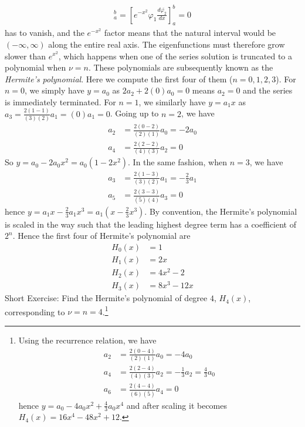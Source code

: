 \begin{solution}
\begin{align*}
[\varphi_1 p(x) \frac{d\overline{\varphi_2}}{dx}]_a^b = [e^{-x^2} \varphi_1 \frac{d\overline{\varphi_2}}{dx}]_a^b = 0
\end{align*}
has to vanish, and the $e^{-x^2}$ factor means that the natural interval would be $(-\infty, \infty)$ along the entire real axis. The eigenfunctions must therefore grow slower than $e^{x^2}$, which happens when one of the series solution is truncated to a polynomial when $\nu = n$. These polynomials are subsequently known as the \textit{Hermite's polynomial}. Here we compute the first four of them ($n=0,1,2,3$). For $n=0$, we simply have $y = a_0$ as $2a_2 + 2(0)a_0 = 0$ means $a_2 = 0$ and the series is immediately terminated. For $n=1$, we similarly have $y = a_1x$ as $a_3 = \frac{2(1-1)}{(3)(2)}a_1 = (0)a_1 = 0$. Going up to $n=2$, we have
\begin{align*}
a_2 &= \frac{2(0-2)}{(2)(1)}a_0 = -2a_0 \\
a_4 &= \frac{2(2-2)}{(4)(3)}a_2 = 0
\end{align*}
So $y = a_0 - 2a_0 x^2 = a_0(1-2x^2)$. In the same fashion, when $n=3$, we have
\begin{align*}
a_3 &= \frac{2(1-3)}{(3)(2)}a_1 = -\frac{2}{3}a_1 \\
a_5 &= \frac{2(3-3)}{(5)(4)}a_3 = 0
\end{align*}
hence $y = a_1x - \frac{2}{3}a_1x^3 = a_1(x-\frac{2}{3}x^3)$. By convention, the Hermite's polynomial is scaled in the way such that the leading highest degree term has a coefficient of $2^n$. Hence the first four of Hermite's polynomial are
\begin{align*}
H_0(x) &= 1 \\
H_1(x) &= 2x \\
H_2(x) &= 4x^2 - 2 \\
H_3(x) &= 8x^3 - 12x
\end{align*}
Short Exercise: Find the Hermite's polynomial of degree $4$, $H_4(x)$, corresponding to $\nu = n = 4$.\footnote{Using the recurrence relation, we have
\begin{align*}
a_2 &= \frac{2(0-4)}{(2)(1)}a_0 = -4a_0 \\
a_4 &= \frac{2(2-4)}{(4)(3)}a_2 = -\frac{1}{3}a_2 = \frac{4}{3}a_0 \\
a_6 &= \frac{2(4-4)}{(6)(5)}a_4 = 0
\end{align*}
hence $y = a_0 - 4a_0x^2 + \frac{4}{3}a_0x^4$ and after scaling it becomes $H_4(x) = 16x^4 - 48x^2 + 12$.}
\end{solution}

